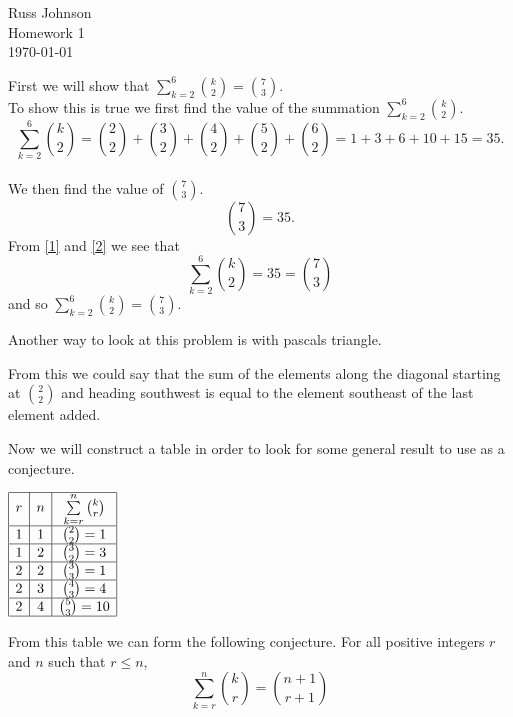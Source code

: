 \documentclass[12pt]{article}
\begin{document}
\begin{flushright}
Russ Johnson\\
Homework 1\\
\today\\
\end{flushright}


First we will show that $\sum\limits_{k=2}^6\binom{k}{2} = \binom{7}{3}.$\\
To show this is true we first find the value of the summation $\sum\limits_{k=2}^6\binom{k}{2}.$
\begin{equation}\label{1}
\sum\limits_{k=2}^6\binom{k}{2} = \binom{2}{2} + \binom{3}{2} + \binom{4}{2} + \binom{5}{2} + \binom{6}{2} = 1+3+6+10+15 = 35.
\end{equation} \\
We then find the value of $\binom{7}{3}.$
\begin{equation}\label{2}
\binom{7}{3} = 35.
\end{equation}
From \eqref{1} and \eqref{2} we see that
\[\sum\limits_{k=2}^6\binom{k}{2} = 35 = \binom{7}{3}\]
and so $\sum\limits_{k=2}^6\binom{k}{2} = \binom{7}{3}.$

Another way to look at this problem is with pascals triangle.
\begin{adjustwidth}{-2cm}{}

\end{adjustwidth}
From this we could say that the sum of the elements along the diagonal starting at $\binom{2}{2}$ and heading southwest is equal to the element southeast of the last element added.

Now we will construct a table in order to look for some general result to use as a conjecture.
\begingroup
\renewcommand*{\arraystretch}{1.5}
\begin{center}
$
\begin{array}{|c|c|c|c|}
\hline
r&n&\sum\limits_{k=r}^n\binom{k}{r}\\\hline
1&1&\binom{2}{2}=1\\\hline
1&2&\binom{3}{2}=3\\\hline
2&2&\binom{3}{3}=1\\\hline
2&3&\binom{4}{3}=4\\\hline
2&4&\binom{5}{3}=10\\\hline
\end{array}
$
\end{center}
\endgroup

From this table we can form the following conjecture. For all positive integers $r$ and $n$ such that $r\leq n$,
\[\sum\limits_{k=r}^{n}\binom{k}{r} = \binom{n+1}{r+1}\]
\end{document}
